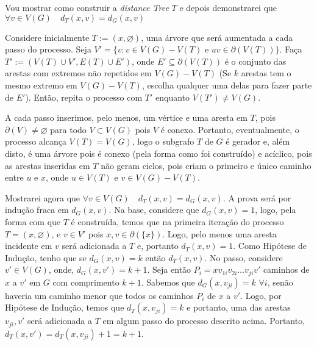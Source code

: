 Vou mostrar como construir a {\it distance Tree} $T$ e depois demonstrarei que $\forall v \in V(G)\quad d_T(x,v) = d_G(x,v)$

Considere inicialmente $T:=({x},\varnothing)$, uma árvore que será aumentada a cada passo do processo. Seja  $V' = \{v: v \in V(G) - V(T)$ e $uv \in \partial(V(T))\}$.
%
Faça $T' := (V(T)\cup V', E(T)\cup E')$,  onde $E' \subseteq \partial(V(T))$ é o conjunto das arestas com extremos não repetidos em $V(G) - V(T)$ (Se $k$ arestas tem o mesmo extremo em $V(G) - V(T)$, escolha qualquer uma delas para fazer parte de $E'$).
%
Então, repita o processo com $T'$ enquanto $V(T') \ne V(G)$.

A cada passo inserimos, pelo menos, um vértice e uma aresta em $T$, pois $\partial(V) \ne \varnothing$ para todo $V \subset V(G)$ pois $V$ é conexo.
%
Portanto, eventualmente, o processo alcança $V(T) = V(G)$, logo o subgrafo $T$ de $G$ é gerador e, além disto, é uma árvore pois é conexo (pela forma como foi construído) e acíclico, pois as arestas inseridas em $T$ não geram ciclos, pois criam o primeiro e único caminho entre $u$ e $x$, onde $u \in V(T)$ e $v \in V(G)-V(T)$.

Mostrarei agora que $\forall v \in V(G)\quad d_T(x,v) = d_G(x,v)$. A prova será por indução fraca em $d_G(x,v)$.
%
Na base, considere que $d_G(x,v) = 1$, logo, pela forma com que $T$ é construída, temos que na primeira iteração do processo $T=({x},\varnothing)$, e $v\in V'$ pois ${x,v} \in \partial(\{x\})$.
%
Logo, pelo menos uma aresta incidente em $v$ será adicionada a $T$ e, portanto $d_T(x,v) = 1$.
%
Como Hipótese de Indução, tenho que se $d_G(x,v) = k$ então $d_T(x,v)$.
%
No passo, considere $v' \in V(G)$, onde, $d_G(x,v') = k + 1$.
%
Seja então $P_i = xv_{1i}v_{2i}\ldots v_{ji}v'$ caminhos de $x$ a $v'$ em $G$ com comprimento $k + 1$. 
%
Sabemos que $d_G(x,v_{ji}) = k$ $\forall i$, senão haveria um caminho menor que todos os caminhos $P_i$ de $x$ a $v'$.
%
Logo, por Hipótese de Indução, temos que $d_T(x,v_{ji}) = k$ e portanto, uma das arestas ${v_{ji},v'}$ será adicionada a $T$ em algum passo do processo descrito acima.
%
Portanto, $d_T(x,v') = d_T(x,v_{ji}) + 1 = k + 1$.
\fimprova



